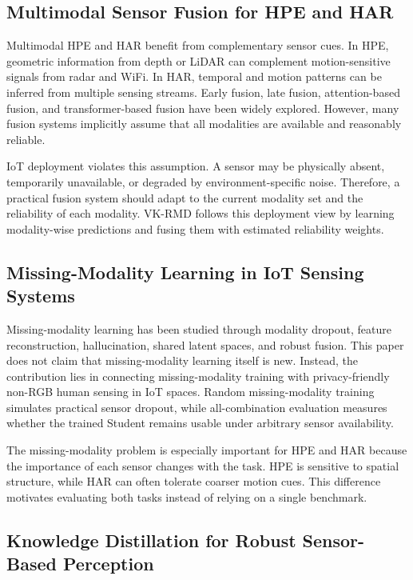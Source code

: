 \documentclass[journal]{IEEEtran}
\begin{document}
\subsection{Multimodal Sensor Fusion for HPE and HAR}

Multimodal HPE and HAR benefit from complementary sensor cues. In HPE, geometric information from depth or LiDAR can complement motion-sensitive signals from radar and WiFi. In HAR, temporal and motion patterns can be inferred from multiple sensing streams. Early fusion, late fusion, attention-based fusion, and transformer-based fusion have been widely explored. However, many fusion systems implicitly assume that all modalities are available and reasonably reliable.

IoT deployment violates this assumption. A sensor may be physically absent, temporarily unavailable, or degraded by environment-specific noise. Therefore, a practical fusion system should adapt to the current modality set and the reliability of each modality. VK-RMD follows this deployment view by learning modality-wise predictions and fusing them with estimated reliability weights.

\subsection{Missing-Modality Learning in IoT Sensing Systems}

Missing-modality learning has been studied through modality dropout, feature reconstruction, hallucination, shared latent spaces, and robust fusion. This paper does not claim that missing-modality learning itself is new. Instead, the contribution lies in connecting missing-modality training with privacy-friendly non-RGB human sensing in IoT spaces. Random missing-modality training simulates practical sensor dropout, while all-combination evaluation measures whether the trained Student remains usable under arbitrary sensor availability.

The missing-modality problem is especially important for HPE and HAR because the importance of each sensor changes with the task. HPE is sensitive to spatial structure, while HAR can often tolerate coarser motion cues. This difference motivates evaluating both tasks instead of relying on a single benchmark.

\subsection{Knowledge Distillation for Robust Sensor-Based Perception}
\end{document}
